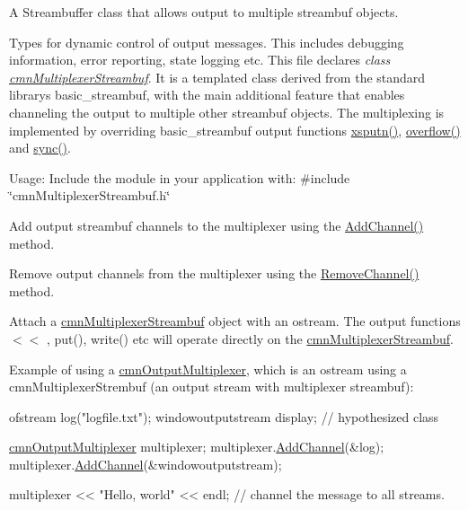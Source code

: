 A Streambuffer class that allows output to multiple streambuf objects. 

Types for dynamic control of output messages. This includes debugging information, error reporting, state logging etc. This file declares {\itshape class \hyperlink{classcmn_multiplexer_streambuf}{cmn\+Multiplexer\+Streambuf}}. It is a templated class derived from the standard library\textquotesingle{}s basic\+\_\+streambuf, with the main additional feature that enables channeling the output to multiple other streambuf objects. The multiplexing is implemented by overriding basic\+\_\+streambuf output functions \hyperlink{classcmn_multiplexer_streambuf_a0e5181e114c169527135d01b28d94169}{xsputn()}, \hyperlink{classcmn_multiplexer_streambuf_a90999d31356176b52174452e2a43c1ae}{overflow()} and \hyperlink{classcmn_multiplexer_streambuf_a3e1f49548cb968afcdeabe62da5a5ae9}{sync()}.

Usage\+: Include the module in your application with\+: \#include \char`\"{}cmn\+Multiplexer\+Streambuf.\+h\char`\"{}

Add output streambuf channels to the multiplexer using the \hyperlink{classcmn_multiplexer_streambuf_a1e33a4858eb94ed085987ddbcc01a1d0}{Add\+Channel()} method.

Remove output channels from the multiplexer using the \hyperlink{classcmn_multiplexer_streambuf_affd9794b9412295cf157d204fc71cf8e}{Remove\+Channel()} method.

Attach a \hyperlink{classcmn_multiplexer_streambuf}{cmn\+Multiplexer\+Streambuf} object with an ostream. The output functions $<$$<$ , put(), write() etc will operate directly on the \hyperlink{classcmn_multiplexer_streambuf}{cmn\+Multiplexer\+Streambuf}.

Example of using a \hyperlink{classcmn_output_multiplexer}{cmn\+Output\+Multiplexer}, which is an ostream using a cmn\+Multiplexer\+Strembuf (an output stream with multiplexer streambuf)\+:


\begin{DoxyCode}
ofstream log(\textcolor{stringliteral}{"logfile.txt"});
windowoutputstream display;   \textcolor{comment}{// hypothesized class}

\hyperlink{classcmn_output_multiplexer}{cmnOutputMultiplexer} multiplexer;
multiplexer.\hyperlink{classcmn_output_multiplexer_a70d534895f21217e1e7e75e837fc65e7}{AddChannel}(&log);
multiplexer.\hyperlink{classcmn_output_multiplexer_a70d534895f21217e1e7e75e837fc65e7}{AddChannel}(&windowoutputstream);

multiplexer << \textcolor{stringliteral}{"Hello, world"} << endl;  \textcolor{comment}{// channel the message to all streams.}
\end{DoxyCode}



